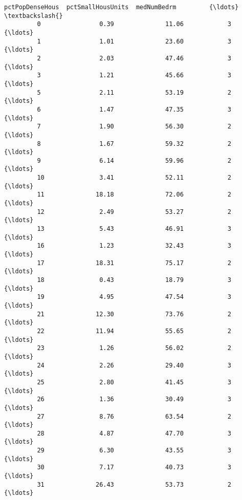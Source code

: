 \documentclass[11pt]{llncs}
\begin{document}
\begin{Verbatim}[commandchars=\\\{\}]
               pctPopDenseHous  pctSmallHousUnits  medNumBedrm         {\ldots}          \textbackslash{}
         0                0.39              11.06            3         {\ldots}           
         1                1.01              23.60            3         {\ldots}           
         2                2.03              47.46            3         {\ldots}           
         3                1.21              45.66            3         {\ldots}           
         5                2.11              53.19            2         {\ldots}           
         6                1.47              47.35            3         {\ldots}           
         7                1.90              56.30            2         {\ldots}           
         8                1.67              59.32            2         {\ldots}           
         9                6.14              59.96            2         {\ldots}           
         10               3.41              52.11            2         {\ldots}           
         11              18.18              72.06            2         {\ldots}           
         12               2.49              53.27            2         {\ldots}           
         13               5.43              46.91            3         {\ldots}           
         16               1.23              32.43            3         {\ldots}           
         17              18.31              75.17            2         {\ldots}           
         18               0.43              18.79            3         {\ldots}           
         19               4.95              47.54            3         {\ldots}           
         21              12.30              73.76            2         {\ldots}           
         22              11.94              55.65            2         {\ldots}           
         23               1.26              56.02            2         {\ldots}           
         24               2.26              29.40            3         {\ldots}           
         25               2.80              41.45            3         {\ldots}           
         26               1.36              30.49            3         {\ldots}           
         27               8.76              63.54            2         {\ldots}           
         28               4.87              47.70            3         {\ldots}           
         29               6.30              43.55            3         {\ldots}           
         30               7.17              40.73            3         {\ldots}           
         31              26.43              53.73            2         {\ldots}           

\end{Verbatim}
\end{document}
